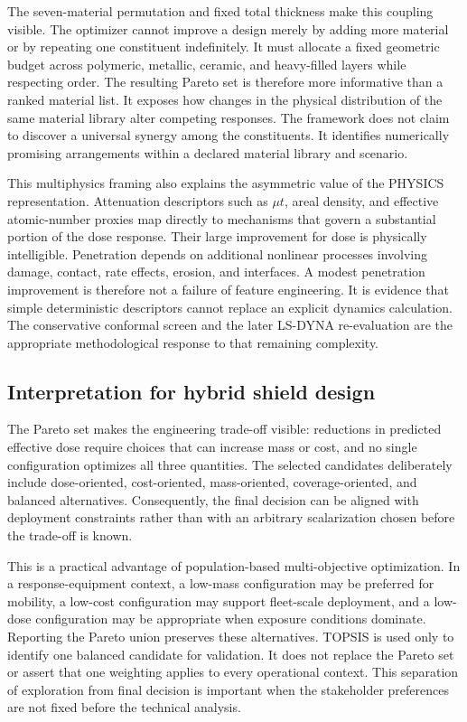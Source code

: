 \documentclass[12pt]{elsarticle}
\begin{document}
	The seven-material permutation and fixed total thickness make this coupling visible. The optimizer cannot improve a design merely by adding more material or by repeating one constituent indefinitely. It must allocate a fixed geometric budget across polymeric, metallic, ceramic, and heavy-filled layers while respecting order. The resulting Pareto set is therefore more informative than a ranked material list. It exposes how changes in the physical distribution of the same material library alter competing responses. The framework does not claim to discover a universal synergy among the constituents. It identifies numerically promising arrangements within a declared material library and scenario.

	This multiphysics framing also explains the asymmetric value of the PHYSICS representation. Attenuation descriptors such as $\mu t$, areal density, and effective atomic-number proxies map directly to mechanisms that govern a substantial portion of the dose response. Their large improvement for dose is physically intelligible. Penetration depends on additional nonlinear processes involving damage, contact, rate effects, erosion, and interfaces. A modest penetration improvement is therefore not a failure of feature engineering. It is evidence that simple deterministic descriptors cannot replace an explicit dynamics calculation. The conservative conformal screen and the later LS-DYNA re-evaluation are the appropriate methodological response to that remaining complexity.
	
	\subsection{Interpretation for hybrid shield design}
	
	The Pareto set makes the engineering trade-off visible: reductions in predicted effective dose require choices that can increase mass or cost, and no single configuration optimizes all three quantities. The selected candidates deliberately include dose-oriented, cost-oriented, mass-oriented, coverage-oriented, and balanced alternatives. Consequently, the final decision can be aligned with deployment constraints rather than with an arbitrary scalarization chosen before the trade-off is known.
	
	This is a practical advantage of population-based multi-objective optimization. In a response-equipment context, a low-mass configuration may be preferred for mobility, a low-cost configuration may support fleet-scale deployment, and a low-dose configuration may be appropriate when exposure conditions dominate. Reporting the Pareto union preserves these alternatives. TOPSIS is used only to identify one balanced candidate for validation. It does not replace the Pareto set or assert that one weighting applies to every operational context. This separation of exploration from final decision is important when the stakeholder preferences are not fixed before the technical analysis.
	
\end{document}
